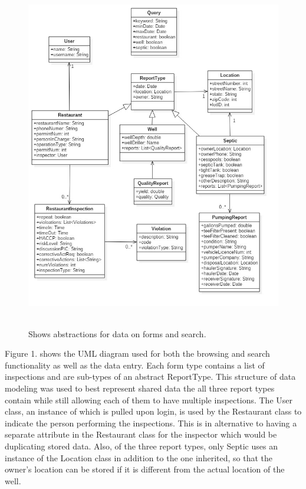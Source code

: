 \documentclass[twoside,letterpaper]{article}
\begin{document}
\begin{figure}[H]
\centering
\includegraphics[width=6in,height=6in]{Browsing_and_Search_UML.jpg}
\caption{Shows abstractions for data on forms and search.}
\end{figure}
\noindent Figure 1. shows the UML diagram used for both the browsing and search functionality as well as the data entry. Each form type contains a list of inspections and are sub-types of an abstract ReportType. This structure of data modeling was used to best represent shared data the all three report types contain while still allowing each of them to have multiple inspections. The User class, an instance of which is pulled upon login, is used by the Restaurant class to indicate the person performing the inspections. This is in alternative to having a separate attribute in the Restaurant class for the inspector which would be duplicating stored data. Also, of the three report types, only Septic uses an instance of the Location class in addition to the one inherited, so that the owner's location can be stored if it is different from the actual location of the well.
\end{document}
